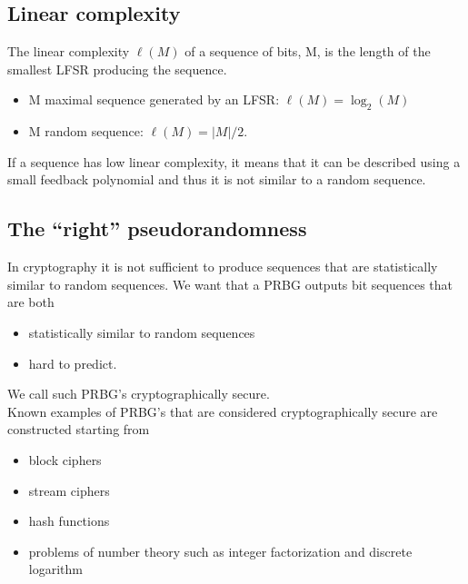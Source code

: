 \documentclass[a4paper, 10pt, titlepage]{article}
\begin{document}
\subsection{Linear complexity}
The linear complexity $\ell(M)$ of a sequence of bits, M, is the length of the smallest LFSR producing the sequence.
\begin{itemize}
\item M maximal sequence generated by an LFSR: $\ell(M) = \log_2(M)$
\item M random sequence: $\ell(M) = |M|/2$.
\end{itemize}
If a sequence has low linear complexity, it means that it can be described using a small feedback polynomial and thus it is not similar to a random sequence.

\subsection{The “right” pseudorandomness}
In cryptography it is not sufficient to produce sequences that are
statistically similar to random sequences.
We want that a PRBG outputs bit sequences that are both
\begin{itemize}
\item statistically similar to random sequences
\item hard to predict.
\end{itemize}
We call such PRBG’s cryptographically secure. \medskip \\
Known examples of PRBG’s that are considered cryptographically secure
are constructed starting from
\begin{itemize}
\item block ciphers
\item stream ciphers
\item hash functions
\item problems of number theory such as integer factorization and discrete logarithm
\end{itemize}
\end{document}
